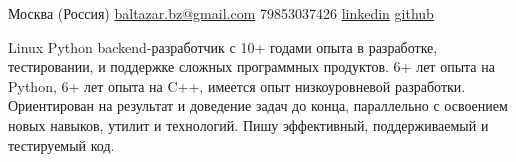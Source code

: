 \documentclass[unicode, 10pt, a4paper, oneside, fleqn]{article}
\begin{document}
\sloppy  %


\nobreakvspace{0.3em}  %

Москва (Россия)
\sbull
\href{mailto:baltazar.bz@gmail.com}{baltazar.bz\mbox{}@\mbox{}gmail.com}\sbull
\textsmaller{+}79853037426\sbull
\href{http://ru.linkedin.com/pub/yuri-bochkarev/21/3a9/555}{linkedin}
\sbull
\href{https://github.com/balta2ar}{github}


\noindent
Linux Python backend-разработчик с 10+ годами опыта в разработке,
    тестировании, и поддержке сложных программных продуктов. 6+ лет опыта на
    Python, 6+ лет опыта на C++, имеется опыт низкоуровневой разработки.
    Ориентирован на результат и доведение задач до конца, параллельно с
    освоением новых навыков, утилит и технологий. Пишу эффективный,
    поддерживаемый и тестируемый код.


\end{document}
